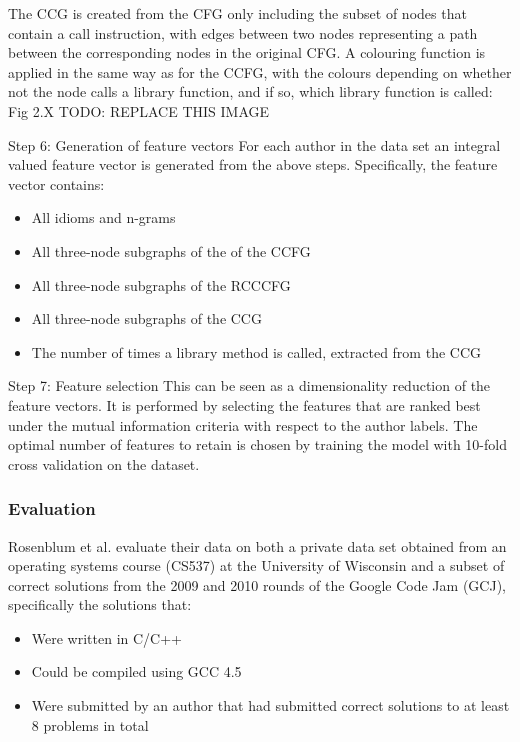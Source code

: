 \documentclass[a4paper,11pt]{kth-mag}
\begin{document}
The CCG is created from the CFG only including the subset of nodes that contain
a call instruction, with edges between two nodes representing a path between
the corresponding nodes in the original CFG. A colouring function is applied in
the same way as for the CCFG, with the colours depending on whether not the
node calls a library function, and if so, which library function is called:
Fig 2.X TODO: REPLACE THIS IMAGE


Step 6: Generation of feature vectors
For each author in the data set an integral valued feature vector is generated
from the  above steps. Specifically, the feature vector contains:

\begin{itemize}
\item All idioms and n-grams
\item All three-node subgraphs of the of the CCFG
\item All three-node subgraphs of the RCCCFG
\item All three-node subgraphs of the CCG
\item The number of times a library method is called, extracted from the CCG
\end{itemize}

Step 7: Feature selection
This can be seen as a dimensionality reduction of the feature vectors. It is
performed by selecting the features that are ranked best under the mutual
information criteria with respect to the author labels. The optimal number of
features to retain is chosen by training the model with 10-fold cross
validation on the dataset.

\subsubsection{Evaluation}
Rosenblum et al. evaluate their data on both a private data set obtained from
an operating systems course (CS537) at the University of Wisconsin and a subset
of correct solutions from the 2009 and 2010 rounds of the Google Code Jam
(GCJ), specifically the solutions that:

\begin{itemize}
\item Were written in C/C++
\item Could be compiled using GCC 4.5 
\item Were submitted by an author that had submitted correct solutions to at
      least 8 problems in total
\end{itemize}
\end{document}
